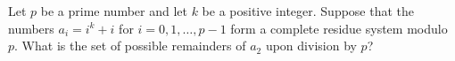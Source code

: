 Let \(p\) be a prime number and let \(k\) be a positive integer. Suppose that the numbers \(a_i = i^k + i\) for \(i = 0, 1, \ldots, p-1\) form a complete residue system modulo \(p\). What is the set of possible remainders of \(a_2\) upon division by \(p\)?
